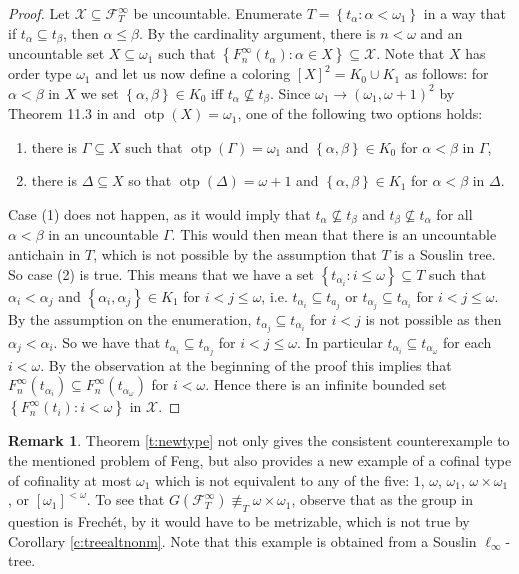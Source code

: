 \documentclass{amsart}
\theoremstyle{plain}
\theoremstyle{definition}
\newtheorem{remark}[theorem]{Remark}
\numberwithin{equation}{section}
\renewcommand{\a}{\alpha}
\renewcommand{\b}{\beta}
\renewcommand{\o}{\omega}
\newcommand{\sst}{\subseteq}
\newcommand{\ft}{\mathcal F^{\infty}_T}
\newcommand{\set}[1]{\left\{#1\right\}}
\newcommand{\otp}{\operatorname{otp}}
\begin{document}
\begin{proof}
	Let $\mathcal X\sst\ft$ be uncountable.
	Enumerate $T=\set{t_{\a}:\a<\o_1}$ in a way that if $t_{\a}\sst t_{\b}$, then $\a\le\b$.
	By the cardinality argument, there is $n<\o$ and an uncountable set $X\sst \o_1$ such that $\set{F^{\infty}_n(t_{\a}):\a\in X}\sst \mathcal X$.
	Note that $X$ has order type $\o_1$ and let us now define a coloring $[X]^2=K_0\cup K_1$ as follows: for $\a<\b$ in $X$ we set $\set{\a,\b}\in K_0$ iff $t_{\a}\not\sst t_{\b}$.
	Since $\o_1\rightarrow (\o_1,\o+1)^2$ by Theorem 11.3 in \cite[pp. 72]{erdos} and $\otp(X)=\o_1$, one of the following two options holds:
	\begin{enumerate}
		\item there is $\Gamma\sst X$ such that $\otp(\Gamma)=\o_1$ and $\set{\a,\b}\in K_0$ for $\a<\b$ in $\Gamma$,
		\item there is $\Delta\sst X$ so that $\otp(\Delta)=\o+1$ and $\set{\a,\b}\in K_1$ for $\a<\b$ in $\Delta$.
	\end{enumerate}
	Case (1) does not happen, as it would imply that $t_{\a}\not\sst t_{\b}$ and $t_{\b}\not\sst t_{\a}$ for all $\a<\b$ in an uncountable $\Gamma$.
	This would then mean that there is an uncountable antichain in $T$, which is not possible by the assumption that $T$ is a Souslin tree.
	So case (2) is true.
	This means that we have a set $\set{t_{\a_i}:i\le\o}\sst T$ such that $\a_i<\a_j$ and $\set{\a_i,\a_j}\in K_1$ for $i<j\le\o$, i.e. $t_{\a_i}\sst t_{a_j}$ or $t_{\a_j}\sst t_{\a_i}$ for $i<j\le\o$.
	By the assumption on the enumeration, $t_{\a_j}\sst t_{\a_i}$ for $i<j$ is not possible as then $\a_j<\a_i$.
	So we have that $t_{\a_i}\sst t_{\a_j}$ for $i<j\le\o$.
	In particular $t_{\a_i}\sst t_{\a_{\o}}$ for each $i<\o$.
	By the observation at the beginning of the proof this implies that $F^{\infty}_n(t_{\a_i})\sst F^{\infty}_n(t_{\a_{\o}})$ for $i<\o$.
	Hence there is an infinite bounded set $\set{F^{\infty}_n(t_i):i<\o}$ in $\mathcal X$. 
\end{proof}

\begin{remark}
	Theorem \ref{t:newtype} not only gives the consistent counterexample to the mentioned problem of Feng, but also provides a new example of a cofinal type of cofinality at most $\o_1$ which is not equivalent to any of the five: $1$, $\o$, $\o_1$, $\o\times\o_1$, or $[\o_1]^{<\o}$.
	To see that $G(\mathcal F^{\infty}_T)\not\equiv_T \o\times\o_1$, observe that as the group in question is Frech\'et, by \cite[Corollary 4.11]{km} it would have to be metrizable, which is not true by Corollary \ref{c:treealtnonm}.
	Note that this example is obtained from a Souslin $\ell_{\infty}$-tree.
\end{remark}
\end{document}
